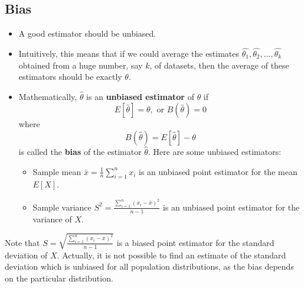 \documentclass[twoside,12pt]{article}
\begin{document}
\subsection{Bias}
\begin{itemize}
\item A good estimator should be unbiased. 
\item Intuitively, this means that if we could average the estimates $\hat{\theta_1}, \hat{\theta_2}, ..., \hat{\theta_k}$ obtained from a huge number, say $k$, of datasets, then the average of these estimators should be exactly $\theta.$ 
\item Mathematically, $\hat{\theta}$ is an \textbf{unbiased estimator} of $\theta$ if $$E[\hat{\theta}] = \theta, \text{ or } B(\hat{\theta}) = 0$$ where $$B(\hat{\theta}) = E[\hat{\theta}] - \theta$$ is called the \textbf{bias} of the estimator $\hat{\theta}$. Here are some unbiased estimators:
\begin{itemize}
\item Sample mean $\bar{x} = \frac{1}{n}\sum_{i=1}^n x_i $ is an unbiased point estimator for the mean $E[X]$.
\item Sample variance $S^2 = \frac{\sum_{i=1}^n (x_i - \bar{x})^2}{n-1}$ is an unbiased point estimator for the variance of $X$. 
\end{itemize}
\end{itemize}
\begin{tcolorbox}
Note that $S = \sqrt{\frac{\sum_{i=1}^n (x_i - \bar{x})^2}{n-1}}$ is a biased point estimator for the standard deviation of $X$. Actually, it is not possible to find an estimate of the standard deviation which is unbiased for all population distributions, as the bias depends on the particular distribution.
\end{tcolorbox}
\end{document}
